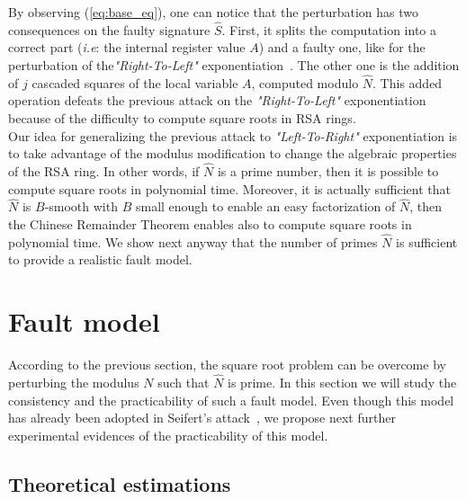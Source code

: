 \documentclass{article}
\begin{document}
By observing (\ref{eq:base_eq}), one can notice that the perturbation
has two consequences on the faulty signature $\hat{S}$. First, it
splits the computation into a correct part (\textit{i.e}: the internal
register value $A$) and a faulty one, like for the perturbation of
the\textit{"Right-To-Left"} exponentiation~\cite{77}. The other one is
the addition of $j$ cascaded squares of the local variable $A$,
computed modulo $\hat{N}$. This added operation defeats the previous
attack on the \textit{"Right-To-Left"} exponentiation~\cite{77}
because of the difficulty to compute square roots in RSA rings.\\
\indent
Our idea for generalizing the previous attack to
\textit{"Left-To-Right"} exponentiation is to take advantage of the
modulus modification to change the algebraic properties of the RSA
ring. In other words, if $\hat{N}$ is a prime number, then it
is possible to compute square roots in polynomial time.
Moreover, it is actually 
sufficient that $\hat{N}$ is $B$-smooth with $B$ small enough to enable
an easy factorization of $\hat{N}$, then the Chinese Remainder Theorem
enables also to compute square roots in polynomial time.
We show next anyway that the number of primes $\hat{N}$ is sufficient to
provide a realistic fault model.

\section{Fault model}
According to the previous section, the square root problem can be
overcome by perturbing the modulus $N$ such that $\hat{N}$ is
prime. In this section we will study the consistency and the
practicability of such a fault model. Even though
 this model has already been adopted in Seifert's attack~\cite{13,67},
 we propose next further experimental evidences of the practicability
 of this model.
\subsection{Theoretical estimations}
\label{sec:prime_study}
\end{document}
